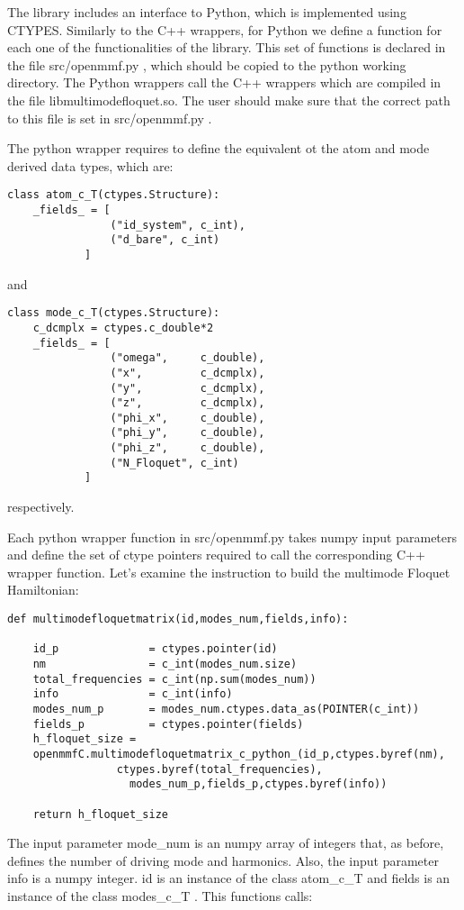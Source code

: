 \documentclass[10pt,a4paper]{article}
\begin{document}
The library includes an interface to Python, which is implemented using CTYPES. Similarly to the C++ wrappers, for Python we define a function for each one of the functionalities of the library. This set of functions is declared in the file   src/openmmf.py , which should be copied to the python working directory. The Python wrappers call the C++ wrappers which are compiled in the file libmultimodefloquet.so. The user should make sure that the correct path to this file is set in   src/openmmf.py .

The python wrapper requires to define the equivalent ot the   atom and   mode  derived data types, which are:

\begin{verbatim}
class atom_c_T(ctypes.Structure):
    _fields_ = [
                ("id_system", c_int),
                ("d_bare", c_int)            
            ]
\end{verbatim}
and
\begin{verbatim}
class mode_c_T(ctypes.Structure):
    c_dcmplx = ctypes.c_double*2
    _fields_ = [
                ("omega",     c_double),
                ("x",         c_dcmplx),
                ("y",         c_dcmplx),
                ("z",         c_dcmplx),            
                ("phi_x",     c_double),
                ("phi_y",     c_double),
                ("phi_z",     c_double),
                ("N_Floquet", c_int)
            ]
\end{verbatim}
respectively.

Each python wrapper function in   src/openmmf.py  takes numpy input parameters and define the set of ctype pointers required to call the corresponding C++ wrapper function. Let's examine the instruction to build the multimode Floquet Hamiltonian:

\begin{verbatim}
def multimodefloquetmatrix(id,modes_num,fields,info):
 
    id_p              = ctypes.pointer(id)
    nm                = c_int(modes_num.size)
    total_frequencies = c_int(np.sum(modes_num))    
    info              = c_int(info)
    modes_num_p       = modes_num.ctypes.data_as(POINTER(c_int))
    fields_p          = ctypes.pointer(fields)
    h_floquet_size =    
    openmmfC.multimodefloquetmatrix_c_python_(id_p,ctypes.byref(nm),
                 ctypes.byref(total_frequencies),
				   modes_num_p,fields_p,ctypes.byref(info))
 
    return h_floquet_size
\end{verbatim}
The input parameter   mode\_num  is an numpy array of integers that, as before, defines the number of driving mode and harmonics. Also, the input parameter   info  is a numpy integer.   id  is an instance of the class   atom\_c\_T  and   fields  is an instance of the class   modes\_c\_T . This functions calls: 
\end{document}
